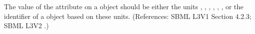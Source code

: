 The value of the attribute  on a \Model object should be
either the units , , ,
, , , or the identifier of a
\UnitDefinition object based on these units.  (References: SBML L3V1 Section 4.2.3; SBML L3V2
.)
